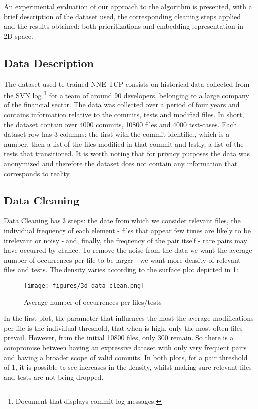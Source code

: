 An experimental evaluation of our approach to the algorithm is presented, with a brief description of the dataset used, the corresponding cleaning steps applied and the results obtained: both prioritizations and embedding representation in 2D space.

\subsection{Data Description} 

The dataset used to trained NNE-TCP consists on historical data collected from the SVN log \footnote{Document that displays commit log messages.} for a team of around 90 developers, belonging to a large company of the financial sector. The data was collected over a period of four years and contains information relative to the commits, tests and modified files. In short, the dataset contain over 4000 commits, 10800 files and 4000 test-cases.
Each dataset row has 3 columns: the first with the commit identifier, which is a number, then a list of the files modified in that commit and lastly, a list of the tests that transitioned.
It is worth noting that for privacy purposes the data was anonymized and therefore the dataset does not contain any information that corresponds to reality. 

\subsection{Data Cleaning}

Data Cleaning has 3 steps: the date from which we consider relevant files, the individual frequency of each element - files that appear few times are likely to be irrelevant or noisy - and, finally, the frequency of the pair itself - rare pairs may have occurred by chance. To remove the noise from the data we want the average number of occurrences per file to be larger - we want more density of relevant files and tests. The density varies according to the surface plot depicted in \ref{surf}:

\begin{figure}[h]
	\centering
	\texttt{[image: figures/3d\_data\_clean.png]}
	\caption{Average number of occurrences per files/tests}
	\label{surf}
\end{figure}

In the first plot, the parameter that influences the most the average modifications per file is the individual threshold, that when is high, only the most often files prevail. However, from the initial 10800 files, only 300 remain. So there is a compromise between having an expressive dataset with only very frequent pairs and having a broader scope of valid commits. 
In both plots, for a pair threshold of 1, it is possible to see increases in the density, whilst making sure relevant files and tests are not being dropped. 

